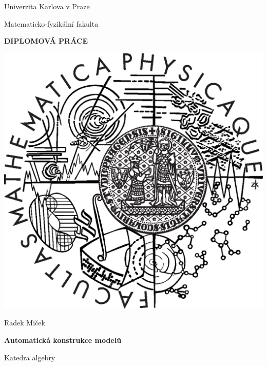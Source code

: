 \documentclass{cs-dipl}
\begin{document}
\renewcommand\thepage{Titulni strana}
\pagestyle{empty}


\begin{center}

\large
\vspace*{5mm}

Univerzita Karlova v Praze

\vspace{1mm}

Matematicko-fyzikální fakulta

\vspace{5mm}

{\Large\bf DIPLOMOVÁ PRÁCE}

\vspace{10mm}

\includegraphics[scale=0.4]{logo.eps}

\vspace{15mm}

{\Large Radek Miček}

\vspace{5mm}
{\LARGE\bf Automatická konstrukce modelů}

\vspace{5mm}
Katedra algebry


\end{center}
\end{document}
